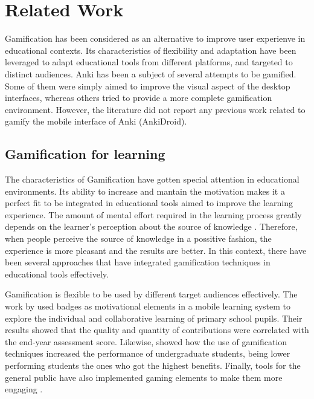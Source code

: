 
\chapter{Related Work} %

\label{rela} %


Gamification has been considered as an alternative to improve user experienve in educational contexts. Its characteristics of flexibility and adaptation have been leveraged to adapt educational tools from different platforms, and targeted to distinct audiences. Anki has been a subject of several attempts to be gamified. Some of them were simply aimed to improve the visual aspect of the desktop interfaces, whereas others tried to provide a more complete gamification environment. However, the literature did not report any previous work related to gamify the mobile interface of Anki (AnkiDroid).

\section{Gamification for learning}
The characteristics of Gamification have gotten special attention in educational environments. Its ability to increase and mantain the motivation makes it a perfect fit to be integrated in educational tools aimed to improve the learning experience. The amount of mental effort required in the learning process greatly depends on the learner's perception about the source of knowledge \citep{salomon1983differential}. Therefore, when people perceive the source of knowledge in a possitive fashion, the experience is more pleasant and the results are better. In this context, there have been several approaches that have integrated gamification techniques in educational tools effectively.

Gamification is flexible to be used by different target audiences effectively. The work by \citep{boticki2015usage} used badges as motivational elements in a mobile learning system to explore the individual and collaborative learning of primary school pupils. Their results showed that the quality and quantity of contributions were correlated with the end-year assessment score. Likewise, \citep{slish2015gamification} showed how the use of gamification techniques increased the performance of undergraduate students, being lower performing students the ones who got the highest benefits. Finally, tools for the general public have also implemented gaming elements to make them more engaging \citep{morrison2014khan}.

